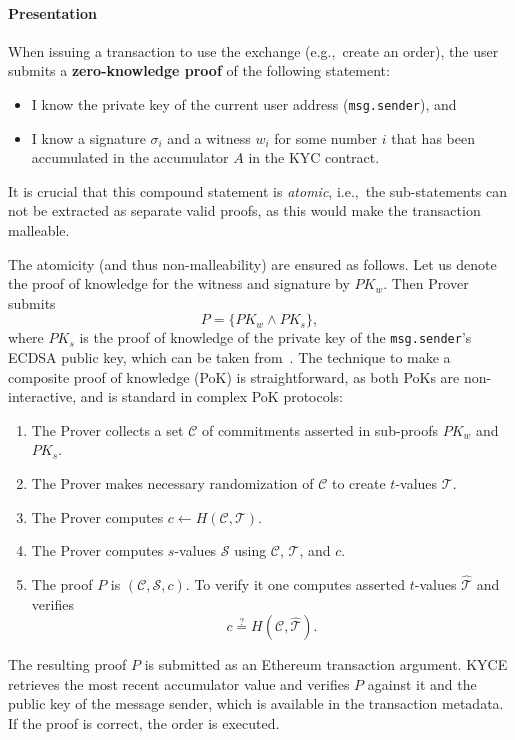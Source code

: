 \paragraph{Presentation} 
When issuing a transaction to use the exchange (e.g.,~create an order), the user submits a \textbf{zero-knowledge proof} of the following statement:
\begin{itemize}
	\item I know the private key of the current user address (\texttt{msg.sender}), and
	\item I know a signature $\sigma_i$ and a witness $w_i$ for some number $i$ that has been accumulated in the
	accumulator $A$ in the KYC contract.
\end{itemize}
It is crucial that this compound statement is \textit{atomic}, i.e.,~the sub-statements can not be extracted as separate valid proofs, as this would make the transaction malleable.

The atomicity (and thus non-malleability) are ensured as follows.
Let us denote the proof of knowledge for the witness and signature by $PK_w$.
Then Prover submits 
$$
P = \{PK_w \wedge PK_s\},
$$
where $PK_s$ is the proof of knowledge of the private key of the \texttt{msg.sender}'s ECDSA public key, which can be taken from~\cite{Chase2016}.
The technique to make a composite proof of knowledge (PoK) is straightforward, as both PoKs are non-interactive, and is standard in complex PoK protocols:
\begin{enumerate}
	\item The Prover collects a set $\mathcal{C}$ of commitments asserted in sub-proofs $PK_w$ and $PK_s$.
	\item The Prover makes necessary randomization of $\mathcal{C}$ to create $t$-values $\mathcal{T}$.
	\item The Prover computes $c \leftarrow H(\mathcal{C},\mathcal{T})$.
	\item The Prover computes $s$-values $\mathcal{S}$ using
	$\mathcal{C}$, $\mathcal{T}$, and $c$.
	\item The proof $P$ is $(\mathcal{C}, \mathcal{S},c)$.
	To verify it one computes asserted $t$-values $\widehat{\mathcal{T}}$ and verifies
	$$
	c\overset{?}{=}H(\mathcal{C},\widehat{\mathcal{T}}).
	$$
\end{enumerate}

The resulting proof $P$ is submitted as an Ethereum transaction argument.
KYCE retrieves the most recent accumulator value and verifies $P$ against it and the public key of the message sender, which is available in the transaction metadata.
If the proof is correct, the order is executed.


